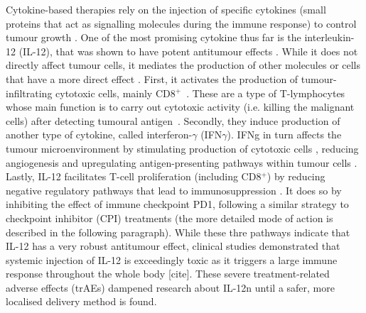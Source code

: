 \documentclass[11pt]{article}
\begin{document}
%
\par Cytokine-based therapies rely on the injection of specific cytokines (small proteins that act as signalling molecules during the immune response) to control tumour growth \cite{ioDef}. One of the most promising cytokine thus far is the interleukin-12 (IL-12), that was shown to have potent antitumour effects \cite{il12IsCool}. While it does not directly affect tumour cells, it mediates the production of other molecules or cells that have a more direct effect \cite{il12CytokineStorm}. First, it activates the production of tumour-infiltrating cytotoxic cells, mainly CD8$^+$~\cite{cd8FirstWay}. These are a type of T-lymphocytes whose main function is to carry out cytotoxic activity (i.e. killing the malignant cells) after detecting tumoural antigen~\cite{cd8Effects}. Secondly, they induce production of another type of cytokine, called interferon-$\gamma$ (IFN$\gamma$). IFNg in turn affects the tumour microenvironment by stimulating production of cytotoxic cells \cite{ifngNKProd}, reducing angiogenesis \cite{ifngAngiogenesis} and upregulating antigen-presenting pathways within tumour cells \cite{ifngAntigenExposure}. Lastly, IL-12 facilitates T-cell proliferation (including CD8$^+$) by reducing negative regulatory pathways that lead to immunosuppression \cite{reducImmunoSuppression}. It does so by inhibiting the effect of immune checkpoint PD1, following a similar strategy to checkpoint inhibitor (CPI) treatments (the more detailed mode of action is described in the following paragraph). While these thre pathways indicate that IL-12 has a very robust antitumour effect, clinical studies demonstrated that systemic injection of IL-12 is exceedingly toxic as it triggers a large immune response throughout the whole body [cite]. These severe treatment-related adverse effects (trAEs) dampened research about IL-12n until a safer, more localised delivery method is found. 
\end{document}
